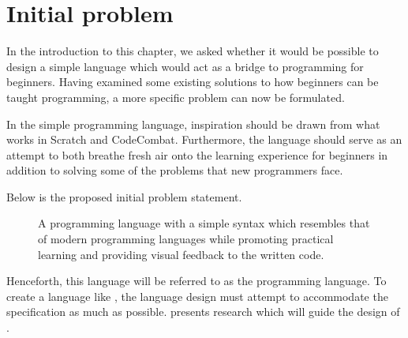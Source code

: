 \section{Initial problem}\label{sec:initial_problem}
In the introduction to this chapter, we asked whether it would be possible to design a simple language which would act as a bridge to programming for beginners.
Having examined some existing solutions to how beginners can be taught programming, a more specific problem can now be formulated.

In the simple programming language, inspiration should be drawn from what works in Scratch and CodeCombat. Furthermore, the language should serve as an attempt to both breathe fresh air onto the learning experience for beginners in addition to solving some of the problems that new programmers face.

Below is the proposed initial problem statement.

\begin{figure}[h]
    \vspace{0.5cm}
    \centering
    \begin{framed}
        A programming language with a simple syntax which resembles that of modern programming languages while promoting practical learning and providing visual feedback to the written code.
    \end{framed}
    \vspace{-0.5cm}
    \label{fig:dazel_specification}
    \vspace{0.5cm}
\end{figure}

Henceforth, this language will be referred to as the \textit{\dazel{}} programming language.
To create a language like \dazel{}, the language design must attempt to accommodate the specification as much as possible.  presents research which will guide the design of \dazel{}.